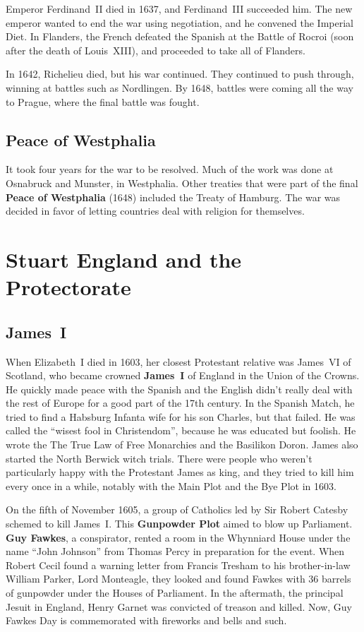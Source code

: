 Emperor Ferdinand~II died in 1637, and Ferdinand~III succeeded him.
The new emperor wanted to end the war using negotiation, and he convened the Imperial Diet.
In Flanders, the French defeated the Spanish at the Battle of Rocroi
(soon after the death of Louis~XIII), and proceeded to take all of Flanders.

In 1642, Richelieu died, but his war continued.
They continued to push through, winning at battles such as Nordlingen.
By 1648, battles were coming all the way to Prague, where the final battle was fought.

\subsection*{Peace of Westphalia}

It took four years for the war to be resolved.
Much of the work was done at Osnabruck and Munster, in Westphalia.
Other treaties that were part of the final \textbf{Peace of Westphalia} (1648)
included the Treaty of Hamburg.
The war was decided in favor of letting countries deal with religion for themselves.

\section{Stuart England and the Protectorate}

\subsection*{James~I}

When Elizabeth~I died in 1603, her closest Protestant relative was
James~VI of Scotland, who became crowned \textbf{James~I} of England in the Union of the Crowns.
He quickly made peace with the Spanish
and the English didn't really deal with the rest of Europe for a good part of the 17th century.
In the Spanish Match, he tried to find a Habsburg Infanta wife for his son Charles, but that failed.
He was called the ``wisest fool in Christendom'', because he was educated but foolish.
He wrote the The True Law of Free Monarchies and the Basilikon Doron.
James also started the North Berwick witch trials.
There were people who weren't particularly happy with the Protestant James as king,
and they tried to kill him every once in a while, notably with the Main Plot and the Bye Plot in 1603.

On the fifth of November 1605, a group of Catholics led by Sir Robert Catesby schemed to kill James~I.
This \textbf{Gunpowder Plot} aimed to blow up Parliament.
\textbf{Guy Fawkes}, a conspirator, rented a room in the Whynniard House
under the name ``John Johnson'' from Thomas Percy in preparation for the event.
When Robert Cecil found a warning letter from Francis Tresham to his brother-in-law William Parker, Lord Monteagle,
they looked and found Fawkes with 36 barrels of gunpowder under the Houses of Parliament.
In the aftermath, the principal Jesuit in England, Henry Garnet was convicted of treason and killed.
Now, Guy Fawkes Day is commemorated with fireworks and bells and such.

